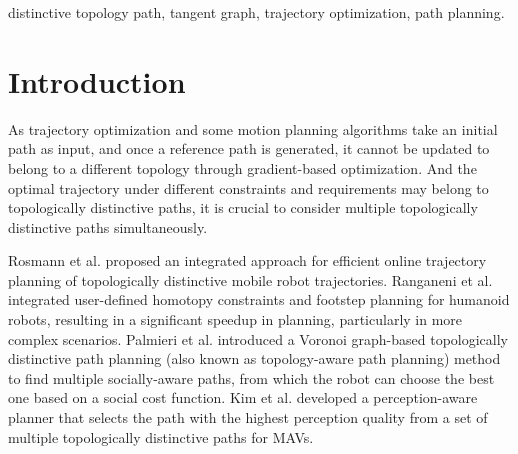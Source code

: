 \documentclass[lettersize,journal]{IEEEtran}
\begin{document}
\begin{IEEEkeywords}
distinctive topology path, tangent graph, trajectory optimization, path planning.
\end{IEEEkeywords}

\section{Introduction}
As trajectory optimization and some motion planning algorithms take an initial path as input, and once a reference path is generated, it cannot be updated to belong to a different topology through gradient-based optimization. And the optimal trajectory under different constraints and requirements may belong to topologically distinctive paths, it is crucial to consider multiple topologically distinctive paths simultaneously.

Rosmann et al. \cite{rosmann2017integrated} proposed an integrated approach for efficient online trajectory planning of topologically distinctive mobile robot trajectories. Ranganeni et al. \cite{ranganeni2018effective} integrated user-defined homotopy constraints and footstep planning for humanoid robots, resulting in a significant speedup in planning, particularly in more complex scenarios. Palmieri et al. \cite{palmieri2015fast} introduced a Voronoi graph-based topologically distinctive path planning (also known as topology-aware path planning) method to find multiple socially-aware paths, from which the robot can choose the best one based on a social cost function. Kim et al. \cite{kim2021topology} developed a perception-aware planner that selects the path with the highest perception quality from a set of multiple topologically distinctive paths for MAVs.
\end{document}
